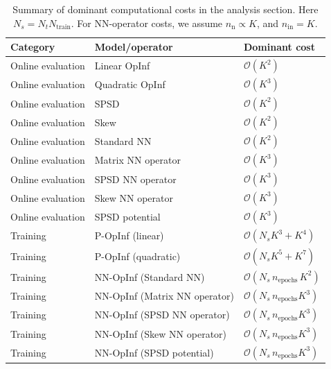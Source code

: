 \documentclass[3p,computermodern,11pt]{elsarticle}
\numberwithin{equation}{section}
\newcommand{\nNeurons}{n_{\mathrm{n}}}
\begin{document}
\begin{table}[t]
    \centering
    \caption{Summary of dominant computational costs in the analysis section. Here $N_s=N_tN_{\text{train}}$. For NN-operator costs, we assume $\nNeurons \propto K$, and $n_{\mathrm{in}}=K$.}
    \label{tab:analysis_cost_summary}
    \begin{tabularx}{\textwidth}{@{}l l X@{}}
        \toprule
        \textbf{Category} & \textbf{Model/operator} & \textbf{Dominant cost} \\
        \midrule
        Online evaluation & Linear OpInf & $\mathcal{O}(K^2)$ \\
        Online evaluation & Quadratic OpInf & $\mathcal{O}(K^3)$ \\
        Online evaluation & SPSD & $\mathcal{O}(K^2)$ \\
        Online evaluation & Skew & $\mathcal{O}(K^2)$ \\
        Online evaluation & Standard NN & $\mathcal{O}(K^2)$ \\
        Online evaluation & Matrix NN operator & $\mathcal{O}(K^3)$ \\
        Online evaluation & SPSD NN operator & $\mathcal{O}(K^3)$ \\
        Online evaluation & Skew NN operator & $\mathcal{O}(K^3)$ \\
        Online evaluation & SPSD potential & $\mathcal{O}(K^3)$ \\
        \midrule
        Training & P-OpInf (linear) & $\mathcal{O}\!\left(N_sK^3 + K^4\right)$ \\
        Training & P-OpInf (quadratic) & $\mathcal{O}\!\left(N_sK^5 + K^7\right)$ \\
        Training & NN-OpInf (Standard NN) & $\mathcal{O}\!\left(N_s\,n_{\text{epochs}}\,K^2\right)$ \\
        Training & NN-OpInf (Matrix NN operator) & $\mathcal{O}\!\left(N_s\,n_{\text{epochs}}K^3\right)$ \\
        Training & NN-OpInf (SPSD NN operator) & $\mathcal{O}\!\left(N_s\,n_{\text{epochs}}K^3\right)$ \\
        Training & NN-OpInf (Skew NN operator) & $\mathcal{O}\!\left(N_s\,n_{\text{epochs}}K^3\right)$ \\
        Training & NN-OpInf (SPSD potential) & $\mathcal{O}\!\left(N_s\,n_{\text{epochs}}K^3\right)$ \\
        \bottomrule
    \end{tabularx}
\end{table}
\end{document}
